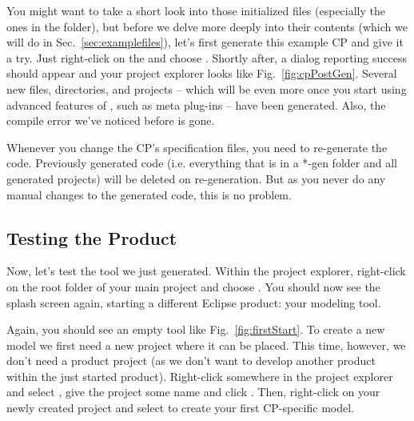 \documentclass[a4paper,american,12pt]{scrreprt}
\begin{document}
You might want to take a short look into those initialized files (especially the ones in the
 folder), but before we delve more deeply
into their contents (which we will do
in Sec.~\ref{sec:examplefiles}), let's first generate this example CP and give
it a try. Just right-click on the  and
choose . Shortly after, a dialog reporting success should appear and your project explorer
looks like Fig.~\ref{fig:cpPostGen}. Several new files, directories, and
projects -- which will be even more once you start using advanced
features of \cinco{}, such as meta plug-ins -- have been generated. Also, the
compile error we've noticed before is gone. 

Whenever you change the CP's specification files, you need to re-generate the
code. Previously generated code (i.e. everything that is in a *-gen folder and
all generated projects) will be deleted on re-generation. But as you never do
any manual changes to the generated code, this is no problem. 

\subsection{Testing the \cinco Product} \label{sec:testing}

Now, let's test the tool we just generated. Within the project explorer,
right-click on the root folder of your main project and choose . You should now see the \cinco splash screen again,
starting a different Eclipse product: your modeling tool. \footnotemark


Again, you should see an empty tool like Fig.~\ref{fig:firstStart}. To create a
new model we first need a new project where it can be placed. This time,
however, we don't need a \cinco product project (as we don't want to develop
another \cinco product within the just started \cinco product). 
Right-click somewhere in the project explorer and select
, give the project some name
and click . Then, right-click on your newly created project and
select  to create your
first CP-specific model.
\end{document}
